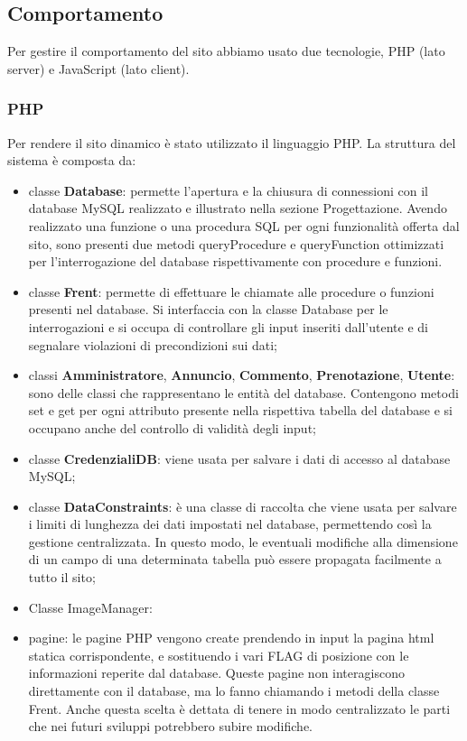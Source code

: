 \documentclass[1_relazione.tex]{subfiles}
\begin{document}
\subsection{Comportamento}
Per gestire il comportamento del sito abbiamo usato due tecnologie, PHP (lato server) e JavaScript (lato client).

\subsubsection{PHP}
Per rendere il sito dinamico \`{e} stato utilizzato il linguaggio PHP.
La struttura del sistema \`{e} composta da:
\begin{itemize}
    \item classe \textbf{Database}: permette l'apertura e la chiusura di connessioni con il database MySQL realizzato e illustrato nella sezione Progettazione.
    Avendo realizzato una funzione o una procedura SQL per ogni funzionalit\`{a} offerta dal sito, sono presenti due metodi queryProcedure e queryFunction ottimizzati per l'interrogazione del database rispettivamente con procedure e funzioni.
    \item classe \textbf{Frent}: permette di effettuare le chiamate alle procedure o funzioni presenti nel database. Si interfaccia con la classe Database per le interrogazioni e si occupa di controllare gli input inseriti dall'utente e di segnalare violazioni di precondizioni sui dati;
    \item classi \textbf{Amministratore}, \textbf{Annuncio}, \textbf{Commento}, \textbf{Prenotazione}, \textbf{Utente}: sono delle classi che rappresentano le entit\`{a} del database. Contengono metodi set e get per ogni attributo presente nella rispettiva tabella del database e si occupano anche del controllo di validit\`{a} degli input;
    \item classe \textbf{CredenzialiDB}: viene usata per salvare i dati di accesso al database MySQL;
    \item classe \textbf{DataConstraints}: \`{e} una classe di raccolta che viene usata per salvare i limiti di lunghezza dei dati impostati nel database, permettendo cos\`{i} la gestione centralizzata. In questo modo, le eventuali modifiche alla dimensione di un campo di una determinata tabella pu\`{o} essere propagata facilmente a tutto il sito;
    \item Classe ImageManager: %
    \item pagine: le pagine PHP vengono create prendendo in input la pagina html statica corrispondente, e sostituendo i vari FLAG di posizione con le informazioni reperite dal database. Queste pagine non interagiscono direttamente con il database, ma lo fanno chiamando i metodi della classe Frent. Anche questa scelta \`{e} dettata di tenere in modo centralizzato le parti che nei futuri sviluppi potrebbero subire modifiche.

\end{itemize}
\end{document}
